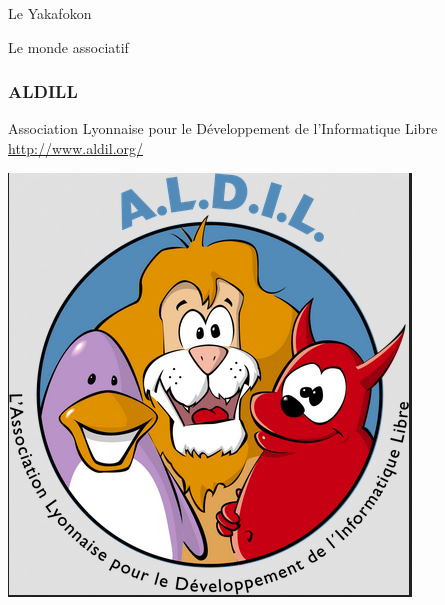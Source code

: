 \documentclass{beamer}
\begin{document}
\begin{frame}
\begin{center}
\Huge{Le Yakafokon}
\end{center}
\end{frame}


\begin{frame}
\begin{center}
\Huge{Le monde associatif}
\end{center}
\end{frame}

\begin{frame}
\frametitle{ALDILL}

\begin{block}{Association Lyonnaise pour le Développement de l'Informatique Libre}
\url{http://www.aldil.org/}
\end{block}
\begin{center}
\includegraphics[scale=0.5] {./images/Aldill.png}
\end{center} 
\end{frame}
\end{document}
